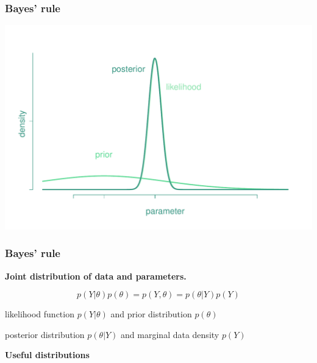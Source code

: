 \documentclass[notes,blackandwhite,mathsans]{beamer}
\begin{document}
{
\begin{frame}
\frametitle{Bayes' rule}

\centering
\includegraphics[scale=0.45]{grphs/learning_better.pdf}

\end{frame}
}




\begin{frame}
\frametitle{Bayes' rule}

\textbf{Joint distribution of data and parameters.}

$$ p\left( Y|\theta \right)p\left( \theta \right) = p\left( Y, \theta \right) =  p\left( \theta|Y \right)p\left( Y \right) $$


\begin{description}\small
\item[Inputs:] {\color{mcxs2}likelihood function} $p\left( Y|\theta \right)$ {\color{mcxs2}and prior distribution} $p\left( \theta \right)$
\item[Outputs:] {\color{mcxs2}posterior distribution} $p\left( \theta|Y \right)$ {\color{mcxs2}and marginal data density} $p\left( Y \right)$
\end{description}

\end{frame}




{
\begin{frame}

\begin{adjustwidth}{-0.5cm}{0cm}
\vspace{8.3cm}\Large
\textbf{{\color{mcxs1}Useful} {\color{mcxs4}distributions}}
\end{adjustwidth}

\end{frame}
}
\end{document}
